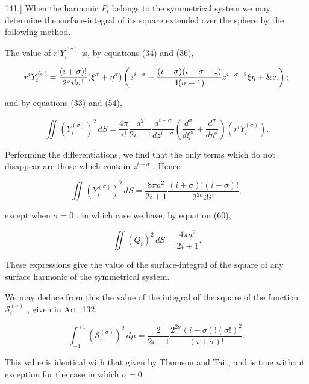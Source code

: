 \documentclass[11pt,a4paper]{article}
\begin{document}
141.] When the harmonic  $P_i$  belongs to the symmetrical system we may determine the surface-integral of its square extended over the sphere by the following method.

The value of  $r^iY_i^{(\sigma)}$  is, by equations (34) and (36),

\[
r^iY_i^{(\sigma)}=\frac{(i+\sigma)!}{2^\sigma i!\sigma!}(\xi^\sigma+\eta^\sigma)
\left(z^{i-\sigma}-\frac{(i-\sigma)(i-\sigma-1)}{4(\sigma+1)}z^{i-\sigma-2}\xi\eta+\hbox{\&c.}\right);
\]

and by equations (33) and (54),

\[
\iint (Y_i^{(\sigma)})^2\,dS=\frac{4\pi}{i!}\frac{a^2}{2i+1}
\frac{d^{i-\sigma}}{dz^{i-\sigma}}\left(\frac{d^\sigma}{d\xi^\sigma}+\frac{d^\sigma}{d\eta^\sigma}\right)(r^iY_i^{(\sigma)}).
\]

Performing the differentiations, we find that the only terms which do not disappear are those which contain  $z^{i-\sigma}$ . Hence

\begin{equation}\tag{66}
\iint (Y_i^{(\sigma)})^2\,dS=\frac{8\pi a^2}{2i+1}\frac{(i+\sigma)!(i-\sigma)!}{2^{2\sigma}i!i!},
\end{equation}

except when  $\sigma = 0$ , in which case we have, by equation (60),

\begin{equation}\tag{67}
\iint (Q_i)^2\,dS=\frac{4\pi a^2}{2i+1}.
\end{equation}

These expressions give the value of the surface-integral of the square of any surface harmonic of the symmetrical system.

We may deduce from this the value of the integral of the square of the function  $\mathcal{S}_{i}^{(\sigma)}$ , given in Art. 132,

\begin{equation}\tag{68}
\int_{-1}^{+1}(\mathcal{S}_i^{(\sigma)})^2\,d\mu
=\frac{2}{2i+1}\frac{2^{2\sigma}(i-\sigma)!(\sigma!)^2}{(i+\sigma)!}.
\end{equation}

This value is identical with that given by Thomson and Tait, and is true without exception for the case in which  $\sigma = 0$ .
\end{document}
